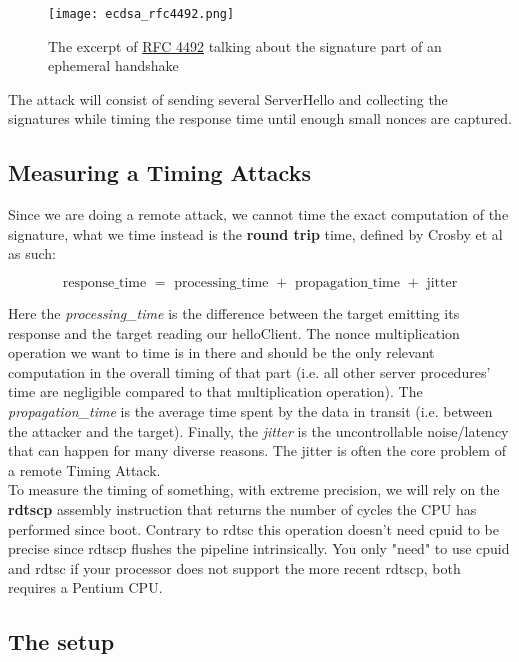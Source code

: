 \documentclass[a4paper,11pt]{article}
\begin{document}
\begin{figure}[H]
\texttt{[image: ecdsa\_rfc4492.png]}
\caption{The excerpt of \href{https://tools.ietf.org/html/rfc4492#section-5.4}{RFC 4492} talking about the signature part of an ephemeral handshake}
\end{figure}

The attack will consist of sending several ServerHello and collecting the signatures while timing the response time until enough small nonces are captured.

\subsection{Measuring a Timing Attacks}

Since we are doing a remote attack, we cannot time the exact computation of the signature, what we time instead is the \textbf{round trip} time, defined by Crosby et al\cite{crosby} as such:

$$ \text{response\_time } = \text{ processing\_time } + \text{ propagation\_time } + \text{ jitter} $$

Here the \textit{processing\_time} is the difference between the target emitting its response and the target reading our helloClient. The nonce multiplication operation we want to time is in there and should be the only relevant computation in the overall timing of that part (i.e. all other server procedures' time are negligible compared to that multiplication operation). The \textit{propagation\_time} is the average time spent by the data in transit (i.e. between the attacker and the target). Finally, the \textit{jitter} is the uncontrollable noise/latency that can happen for many diverse reasons. The jitter is often the core problem of a remote Timing Attack.\\

To measure the timing of something, with extreme precision, we will rely on the \textbf{rdtscp} assembly instruction that returns the number of cycles the CPU has performed since boot. Contrary to rdtsc this operation doesn't need cpuid to be precise since rdtscp flushes the pipeline intrinsically. You only "need" to use cpuid and rdtsc if your processor does not support the more recent rdtscp, both requires a Pentium CPU.

\subsection{The setup}
\end{document}
